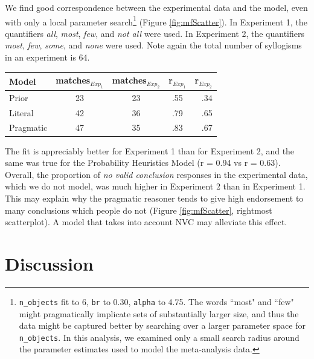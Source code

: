 \documentclass[10pt,letterpaper]{article}
\begin{document}
We find good correspondence between the experimental data and the model, even with only a local parameter search\footnote{ \lstinline{n_objects} fit to 6, \lstinline{br} to 0.30, \lstinline{alpha} to 4.75. The words ``most" and ``few" might pragmatically implicate sets of substantially larger size, and thus the data might be captured better by searching over a larger parameter space for  \lstinline{n_objects}.  In this analysis, we examined only a small search radius around the parameter estimates used to model the meta-analysis data.} (Figure \ref{fig:mfScatter}). In Experiment 1, the quantifiers \emph{all}, \emph{most}, \emph{few}, and \emph{not all} were used. In Experiment 2, the quantifiers \emph{most}, \emph{few}, \emph{some}, and \emph{none} were used. Note again the total number of syllogisms in an experiment is 64.
\begin{tabular}{l*{3}{c}r}
Model              & matches$_{Exp_{1}}$ & matches$_{Exp_{2}}$ & r$_{Exp_{1}}$ & r$_{Exp_{2}}$  \\
\hline
Prior & 23 & 23 & .55 & .34  \\
Literal & 42 & 36 & .79 & .65   \\
Pragmatic & 47 & 35 & .83 & .67  \\
\end{tabular}

%

%
The fit is appreciably better for Experiment 1 than for Experiment 2, and the same was true for the Probability Heuristics Model (r = 0.94 vs r = 0.63). Overall, the proportion of \emph{no valid conclusion} responses in the experimental data, which we do not model, was much higher in Experiment 2 than in Experiment 1. This may explain why the pragmatic reasoner tends to give high endorsement to many conclusions which people do not (Figure \ref{fig:mfScatter}, rightmost scatterplot). A model that takes into account NVC may alleviate this effect.


\section{Discussion}
\end{document}
